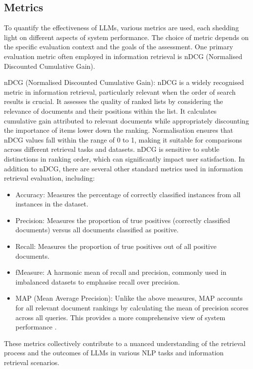 \subsection{Metrics}
To quantify the effectiveness of LLMs, various metrics are used, each shedding light on different aspects of system performance. The choice of metric depends on the specific evaluation context and the goals of the assessment. One primary evaluation metric often employed in information retrieval is nDCG (Normalised Discounted Cumulative Gain).

nDCG (Normalised Discounted Cumulative Gain): nDCG is a widely recognised metric in information retrieval, particularly relevant when the order of search results is crucial. It assesses the quality of ranked lists by considering the relevance of documents and their positions within the list. It calculates cumulative gain attributed to relevant documents while appropriately discounting the importance of items lower down the ranking. Normalisation ensures that nDCG values fall within the range of 0 to 1, making it suitable for comparisons across different retrieval tasks and datasets. nDCG is sensitive to subtle distinctions in ranking order, which can significantly impact user satisfaction.
In addition to nDCG, there are several other standard metrics used in information retrieval evaluation, including:

\begin{itemize}
    \item Accuracy: Measures the percentage of correctly classified instances from all instances in the dataset.
    \item Precision: Measures the proportion of true positives (correctly classified documents) versus all documents classified as positive.
    \item Recall: Measures the proportion of true positives out of all positive documents.
    \item fMeasure: A harmonic mean of recall and precision, commonly used in imbalanced datasets to emphasise recall over precision.
    \item MAP (Mean Average Precision): Unlike the above measures, MAP accounts for all relevant document rankings by calculating the mean of precision scores across all queries. This provides a more comprehensive view of system performance \cite{sokolova}.
\end{itemize}

These metrics collectively contribute to a nuanced understanding of the retrieval process and the outcomes of LLMs in various NLP tasks and information retrieval scenarios.